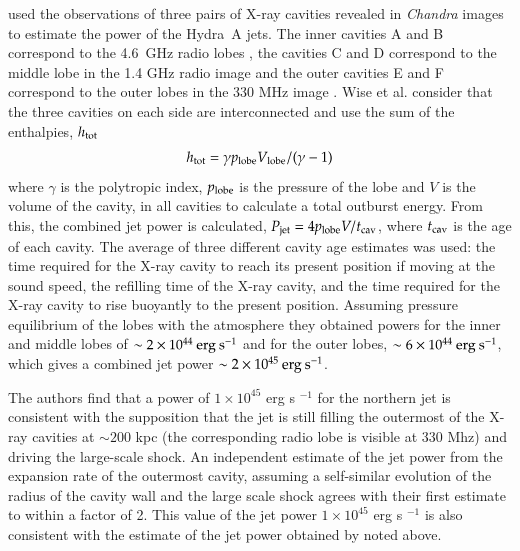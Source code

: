 \citet{wise07} used the observations of three pairs of X-ray cavities revealed in \textit{Chandra} images to estimate the power of the Hydra~A jets. The inner cavities A and B correspond to the 4.6~GHz radio lobes \citep{mcnamara00}, the cavities C and D correspond to the middle lobe in the 1.4 GHz radio image \citep{lane04} and the outer cavities E and F correspond to the outer lobes in the 330 MHz image \citep{wise07}. Wise et al. consider that the three cavities on each side are interconnected and use the sum of the enthalpies, $h_{\rm tot}$
\begin{equation}
h_\mathrm{tot}=\gamma p_{\rm lobe}V_{\rm lobe}/(\gamma -1)
\end{equation}
where $\gamma$ is the polytropic index, $p_{\rm lobe}$ is the pressure of the lobe and $V$ is the volume of the cavity, in all cavities to calculate a total outburst energy. From this, the combined jet power is calculated, $P_\mathrm{jet}=4 p_{\rm lobe} V/t_{\rm cav}$, where $t_{\rm cav}$ is the age of each cavity. The average of three different cavity age estimates was used: the time required for the X-ray cavity to reach its present position if moving at the sound speed, the refilling time of the X-ray cavity, and the time required for the X-ray cavity to rise buoyantly to the present position. Assuming pressure equilibrium of the lobes with the atmosphere they obtained powers for the inner and middle lobes of $\sim 2 \times 10^{44} \> \rm erg \> s^{-1}$ and for the outer lobes, $\sim 6 \times 10^{44} \> \rm erg \> s^{-1}$, which gives a combined jet power $\sim 2 \times 10^{45} \> \rm erg \> s^{-1}$. 

The authors find that a power of $1\times10^{45}$ erg s $^{-1}$ for the northern jet is consistent with the supposition that the jet is still filling the outermost of the X-ray cavities at $\sim200$ kpc (the corresponding radio lobe is visible at 330 Mhz) and driving the large-scale shock. An independent estimate of the jet power from the expansion rate of the outermost cavity, assuming a self-similar evolution of the radius of the cavity wall and the large scale shock agrees with their first estimate to within a factor of 2. This value of the jet power $1\times10^{45}$ erg s $^{-1}$ is also consistent with the estimate of the jet power obtained by \citet{nulsen05} noted above. 

